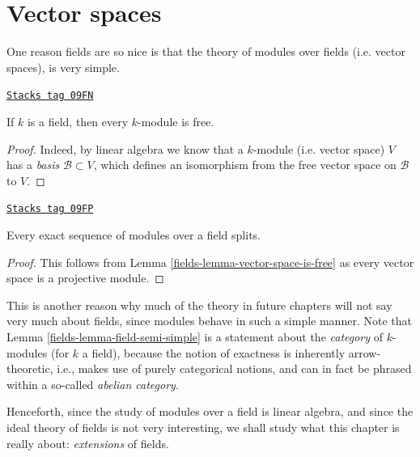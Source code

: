 \section{Vector spaces}
\label{fields-section-vector-spaces}
One reason fields are so nice is that the theory of modules over fields
(i.e. vector spaces), is very simple.

\begin{lemma}
\label{fields-lemma-vector-space-is-free}
\href{https://stacks.math.columbia.edu/tag/09FN}{\texttt{Stacks tag 09FN}}

If $k$ is a field, then every $k$-module is free.
\end{lemma}

\begin{proof}
Indeed, by linear algebra we know that a $k$-module (i.e. vector space)
$V$ has a {\it basis} $\mathcal{B} \subset V$, which defines an isomorphism
from the free vector space on $\mathcal{B}$ to $V$.
\end{proof}

\begin{lemma}
\label{fields-lemma-field-semi-simple}
\href{https://stacks.math.columbia.edu/tag/09FP}{\texttt{Stacks tag 09FP}}

Every exact sequence of modules over a field splits.
\end{lemma}

\begin{proof}

This follows from Lemma \ref{fields-lemma-vector-space-is-free} as every vector
space is a projective module.
\end{proof}

This is another reason why much of the theory in future chapters will not say
very much about fields, since modules behave in such a simple manner.
Note that Lemma \ref{fields-lemma-field-semi-simple} is a statement about the
{\it category} of $k$-modules (for $k$ a field), because the notion of
exactness is inherently arrow-theoretic, i.e., makes use of purely categorical
notions, and can in fact be phrased within a so-called {\it abelian category}.

\medskip\noindent
Henceforth, since the study of modules over a field is linear algebra, and
since the ideal theory of fields is not very interesting, we shall study what
this chapter is really about: {\it extensions} of fields.

